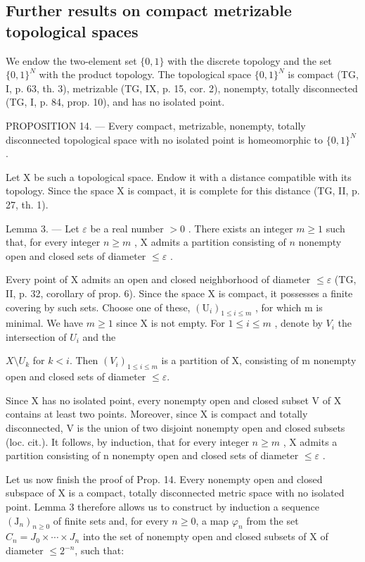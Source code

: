 \subsection{Further results on compact metrizable topological spaces}

We endow the two-element set \(\{0,1\}\) with the discrete topology and the set \(\{0,1\}^{N}\) with the product topology. The topological space \(\{0,1\}^{N}\) is compact (TG, I, p. 63, th. 3), metrizable (TG, IX, p. 15, cor. 2), nonempty, totally disconnected (TG, I, p. 84, prop. 10), and has no isolated point.

PROPOSITION 14. --- Every compact, metrizable, nonempty, totally disconnected topological space with no isolated point is homeomorphic to \(\{0,1\}^{N}\) .

Let X be such a topological space. Endow it with a distance compatible with its topology. Since the space X is compact, it is complete for this distance (TG, II, p. 27, th. 1).

Lemma 3. --- Let \(\varepsilon\) be a real number \(>0\) . There exists an integer \(m \geqslant 1\) such that, for every integer \(n \geqslant m\) , X admits a partition consisting of \(n\) nonempty open and closed sets of diameter \(\leqslant \varepsilon\) .

Every point of X admits an open and closed neighborhood of diameter \(\leqslant\varepsilon\) (TG, II, p. 32, corollary of prop. 6). Since the space X is compact, it possesses a finite covering by such sets. Choose one of these, \((\mathrm{U}_{i})_{1\leqslant i\leqslant m}\) , for which m is minimal. We have \(m\geqslant1\) since X is not empty. For \(1\leqslant i\leqslant m\) , denote by \(V_{i}\) the intersection of \(U_{i}\) and the

\(X\setminus U_k\) for \(k < i\). Then \((V_i)_{1 \leqslant i \leqslant m}\) is a partition of X, consisting of m nonempty open and closed sets of diameter \(\leqslant \varepsilon\).

Since X has no isolated point, every nonempty open and closed subset V of X contains at least two points. Moreover, since X is compact and totally disconnected, V is the union of two disjoint nonempty open and closed subsets (loc. cit.). It follows, by induction, that for every integer \(n \geqslant m\) , X admits a partition consisting of n nonempty open and closed sets of diameter \(\leqslant \varepsilon\) .

Let us now finish the proof of Prop. 14. Every nonempty open and closed subspace of X is a compact, totally disconnected metric space with no isolated point. Lemma 3 therefore allows us to construct by induction a sequence \((\mathrm{J}_{n})_{n\geqslant0}\) of finite sets and, for every \(n\geqslant0\), a map \(\varphi_{n}\) from the set \(C_{n}=J_{0}\times\cdots\times J_{n}\) into the set of nonempty open and closed subsets of X of diameter \(\leqslant2^{-n}\), such that:

